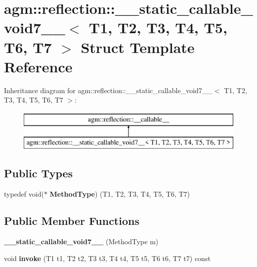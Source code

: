 \hypertarget{structagm_1_1reflection_1_1____static__callable__void7____}{}\section{agm\+:\+:reflection\+:\+:\+\_\+\+\_\+static\+\_\+callable\+\_\+void7\+\_\+\+\_\+$<$ T1, T2, T3, T4, T5, T6, T7 $>$ Struct Template Reference}
\label{structagm_1_1reflection_1_1____static__callable__void7____}
Inheritance diagram for agm\+:\+:reflection\+:\+:\+\_\+\+\_\+static\+\_\+callable\+\_\+void7\+\_\+\+\_\+$<$ T1, T2, T3, T4, T5, T6, T7 $>$\+:\begin{figure}[H]
\begin{center}
\leavevmode
\includegraphics[height=2.000000cm]{structagm_1_1reflection_1_1____static__callable__void7____}
\end{center}
\end{figure}
\subsection*{Public Types}
\begin{DoxyCompactItemize}
\item 
typedef void($\ast$ {\bfseries Method\+Type}) (T1, T2, T3, T4, T5, T6, T7)\hypertarget{structagm_1_1reflection_1_1____static__callable__void7_____a3e3a89d1acbe37406edcff004dea516d}{}\label{structagm_1_1reflection_1_1____static__callable__void7_____a3e3a89d1acbe37406edcff004dea516d}

\end{DoxyCompactItemize}
\subsection*{Public Member Functions}
\begin{DoxyCompactItemize}
\item 
{\bfseries \+\_\+\+\_\+static\+\_\+callable\+\_\+void7\+\_\+\+\_\+} (Method\+Type m)\hypertarget{structagm_1_1reflection_1_1____static__callable__void7_____ac58b2a38029c8b7db91313a290e0ecdc}{}\label{structagm_1_1reflection_1_1____static__callable__void7_____ac58b2a38029c8b7db91313a290e0ecdc}

\item 
void {\bfseries invoke} (T1 t1, T2 t2, T3 t3, T4 t4, T5 t5, T6 t6, T7 t7) const \hypertarget{structagm_1_1reflection_1_1____static__callable__void7_____a4587aee2adbe212132cfa60e21ad4fc7}{}\label{structagm_1_1reflection_1_1____static__callable__void7_____a4587aee2adbe212132cfa60e21ad4fc7}

\end{DoxyCompactItemize}
